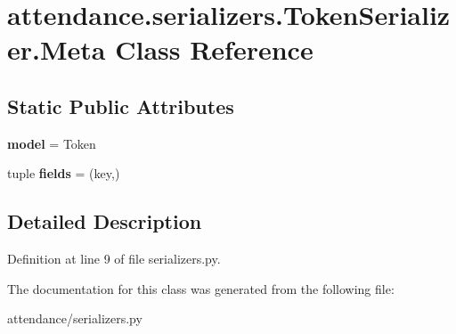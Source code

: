 \hypertarget{classattendance_1_1serializers_1_1_token_serializer_1_1_meta}{}\section{attendance.\+serializers.\+Token\+Serializer.\+Meta Class Reference}
\label{classattendance_1_1serializers_1_1_token_serializer_1_1_meta}
\subsection*{Static Public Attributes}
\begin{DoxyCompactItemize}
\item 
\hypertarget{classattendance_1_1serializers_1_1_token_serializer_1_1_meta_aa657729f5884d9d807a0a74fe7495df9}{}\label{classattendance_1_1serializers_1_1_token_serializer_1_1_meta_aa657729f5884d9d807a0a74fe7495df9} 
{\bfseries model} = Token
\item 
\hypertarget{classattendance_1_1serializers_1_1_token_serializer_1_1_meta_aec31e5cce1900a209e4ee9d51a1bb8c9}{}\label{classattendance_1_1serializers_1_1_token_serializer_1_1_meta_aec31e5cce1900a209e4ee9d51a1bb8c9} 
tuple {\bfseries fields} = (\textquotesingle{}key\textquotesingle{},)
\end{DoxyCompactItemize}


\subsection{Detailed Description}


Definition at line 9 of file serializers.\+py.



The documentation for this class was generated from the following file\+:\begin{DoxyCompactItemize}
\item 
attendance/serializers.\+py\end{DoxyCompactItemize}
